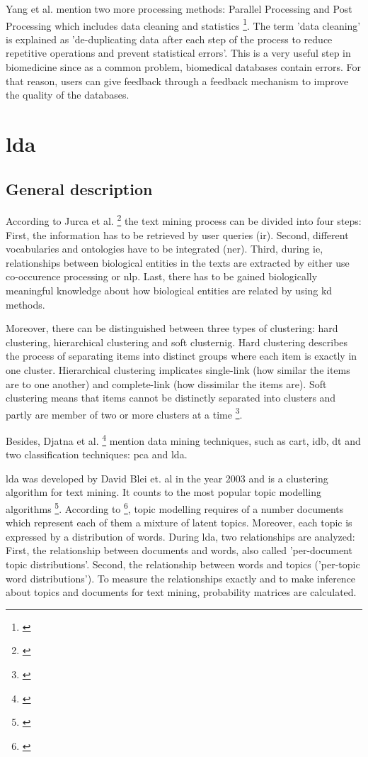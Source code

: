 Yang et al. mention two more processing methods: Parallel Processing and Post Processing which includes data cleaning and statistics \footnote{\autocite{yang_2018}}. The term 'data cleaning' is explained as 'de-duplicating data after each step of the process to reduce repetitive operations and prevent statistical errors'. This is a very useful step in biomedicine since as a common problem, biomedical databases contain errors. For that reason, users can give feedback through a feedback mechanism to improve the quality of the databases.
 
\chapter{\gls{lda}}\label{lda}
\section{General description}\label{lda_description}
According to Jurca et al. \footnote{\autocite{jurca_2016}} the text mining process can be divided into four steps: First, the information has to be retrieved by user queries (\gls{ir}). Second, different vocabularies and ontologies have to be integrated (\gls{ner}). Third, during \gls{ie}, relationships between biological entities in the texts are extracted by either use co-occurence processing or \gls{nlp}. Last, there has to be gained biologically meaningful knowledge about how biological entities are related by using \gls{kd} methods.

Moreover, there can be distinguished between three types of clustering: hard clustering, hierarchical clustering and soft clusternig. Hard clustering describes the process of separating items into distinct groups where each item is exactly in one cluster. Hierarchical clustering implicates single-link (how similar the items are to one another) and complete-link (how dissimilar the items are). Soft clustering means that items cannot be distinctly separated into clusters and partly are member of two or more clusters at a time \footnote{\autocite{jurca_2016}}.  

Besides, Djatna et al. \footnote{\autocite{djatna_2018}} mention data mining techniques, such as \gls{cart}, \gls{idb}, \gls{dt} and two classification techniques: \gls{pca} and \gls{lda}. 

\gls{lda} was developed by David Blei et. al in the year 2003 and is a clustering algorithm for text mining. It counts to the most popular topic modelling algorithms \footnote{\autocite{zhao_2016}}.
According to \footnote{\autocite{zhao_2016}}, topic modelling requires of a number documents which represent each of them a mixture of latent topics. Moreover, each topic is expressed by a distribution of words. During \gls{lda}, two relationships are analyzed: First, the relationship between documents and words, also called 'per-document topic distributions'. Second, the relationship between words and topics ('per-topic word distributions'). To measure the relationships exactly and to make inference about topics and documents for text mining, probability matrices are calculated.

